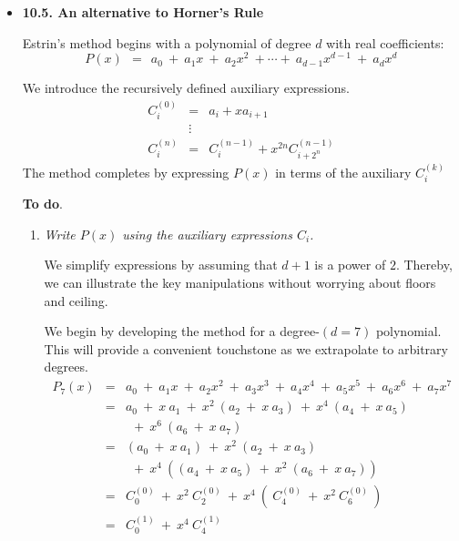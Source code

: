

\begin{itemize}
\item {\bf 10.5. An alternative to Horner's Rule}

\smallskip

Estrin's method begins with a polynomial of degree $d$ with real coefficients:
\[
P(x) \ \ = \ \ a_0 \ + \ a_1 x \ + \ a_2 x^2 \ + \cdots + \ a_{d-1} x^{d-1} \ + \ a_d x^d
\]

We introduce the recursively defined auxiliary expressions.  
\begin{eqnarray*}
C_i^{(0)} & = & a_i + x a_{i+1} \\
                &\vdots &  \\
C_i^{(n)}  & = & C_i^{(n-1)} + x^{2n} C_{i+2^n}^{(n-1)}
\end{eqnarray*}
The method completes by expressing $P(x)$ in terms of the auxiliary $C_i^{(k)}$

\medskip

{\bf To do}.
\begin{enumerate}
\item
{\em Write $P(x)$ using the auxiliary expressions $C_i$.}  

\smallskip

We simplify expressions by assuming that $d+1$ is a power of $2$.  Thereby, we can illustrate the key manipulations without worrying about floors and ceiling.

\smallskip

We begin by developing the method for a degree-$(d=7)$ polynomial.  This will provide a convenient touchstone as we extrapolate to arbitrary degrees.
\begin{eqnarray*}
P_7(x) & = & a_0 \ + \ a_1 x \ + \ a_2 x^2 \ + \ a_{3} x^{3} \ + \ a_4 x^4 \ + \ a_{5} x^{5} \ + \ a_{6} x^{6} \ + \ a_7 x^7 \\
           & = & a_0 \ + \ x \ a_1 \ + \ x^2 \ (a_2 \ + \ x \ a_3) \ + \ x^4 \ (a_4 \ + \ x \ a_5) \\
           &  &  \ \ + \ x^6 \ (a_6 \ + \ x \ a_7) \\
          & = & (a_0 \ + \ x \ a_1) \ + \ x^2 \ (a_2 \ + \ x \ a_3) \\
           & & \ \ + \ x^4 \ \left( (a_4 \ + \ x \ a_5) \ + \ x^2 \ (a_6 \ + \ x \ a_7) \right) \\
          & = & C_{0}^{(0)} \ + \ x^2 \ C_2^{(0)} \ + \ x^4 \ ( \ C_4^{(0)} \ + \ x^2 \ C_{6}^{(0)} \ ) \\
          & = & C_0^{(1)} \ + \ x^4 \ C_4^{(1)} 
\end{eqnarray*}


\end{enumerate}
\end{itemize}
